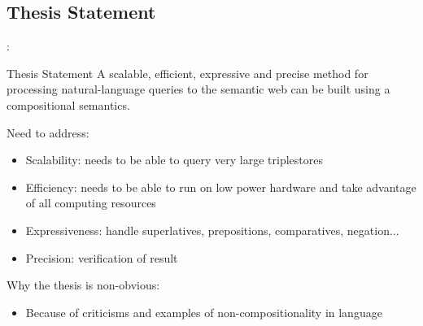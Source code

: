 \documentclass[logoontitle,tabu,supertabular,aspectratio=43]{preney-uwindsor-beamer}
\begin{document}
    \subsection{Thesis Statement}
    \begin{frame}{\insertsection: \insertsubsection}
        \begin{block}{Thesis Statement}
            A scalable, efficient, expressive and precise method for processing natural-language queries to the semantic web can be built using a compositional semantics.
        \end{block}

        Need to address:
        \begin{itemize}
            \item Scalability: needs to be able to query very large triplestores
            \item Efficiency: needs to be able to run on low power hardware and take advantage of all computing resources
            \item Expressiveness: handle superlatives, prepositions, comparatives, negation...
            \item Precision: verification of result
        \end{itemize}

        Why the thesis is non-obvious:
        \begin{itemize}
            \item Because of criticisms and examples of non-compositionality in language
        \end{itemize}
    \end{frame}

\end{document}
